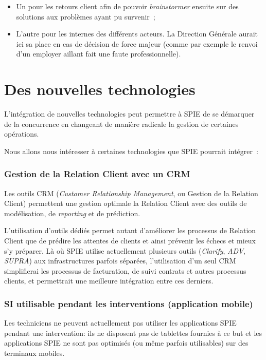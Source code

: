 \begin{itemize}
    \item Un pour les retours client afin de pouvoir \textit{brainstormer} ensuite sur des solutions aux problèmes ayant
    pu survenir~;
    \item L'autre pour les internes des différents acteurs. La Direction Générale aurait ici sa place en cas
    de décision de force majeur (comme par exemple le renvoi d'un employer aillant fait une faute professionnelle).
\end{itemize}


\section{Des nouvelles technologies}

L'intégration de nouvelles technologies peut permettre à SPIE de se démarquer de la concurrence en changeant de manière radicale la gestion de certaines opérations.

Nous allons nous intéresser à certaines technologies que SPIE pourrait intégrer~:


    \subsubsection{Gestion de la Relation Client avec un CRM}

        Les outils CRM (\textit{Customer Relationship Management}, ou Gestion de la Relation Client) permettent une gestion optimale la Relation Client avec des outils de modélisation, de \textit{reporting} et de prédiction.

        L'utilisation d'outils dédiés permet autant d'améliorer les processus de Relation Client que de prédire les attentes de clients et ainsi prévenir les échecs et mieux s'y préparer. Là où SPIE utilise actuellement plusieurs outils (\textit{Clarify}, \textit{ADV}, \textit{SUPRA}) aux infrastructures parfois séparées, l'utilisation d'un seul CRM simplifierai les processus de facturation, de suivi contrats et autres processus clients, et permettrait une meilleure intégration entre ces derniers.

    \subsubsection{SI utilisable pendant les interventions (application mobile)}

        Les techniciens ne peuvent actuellement pas utiliser les applications SPIE pendant une intervention: ils ne disposent pas de tablettes fournies à ce but et les applications SPIE ne sont pas optimisés (ou même parfois utilisables) sur des terminaux mobiles.

